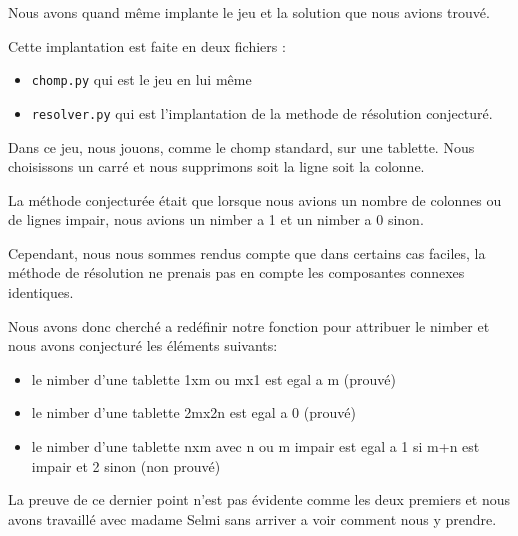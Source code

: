 Nous avons quand même implante le jeu et la solution que nous avions trouvé. 

Cette implantation est faite en deux fichiers :
\begin{itemize}
  \item \texttt{chomp.py} qui est le jeu en lui même
  \item \texttt{resolver.py} qui est l'implantation de la methode de résolution conjecturé.
\end{itemize}

Dans ce jeu, nous jouons, comme le chomp standard, sur une tablette. Nous choisissons un carré et nous supprimons soit la ligne soit la colonne. 

La méthode conjecturée était que lorsque nous avions un nombre de colonnes ou de lignes impair, nous avions un nimber a 1 et un nimber a 0 sinon.

Cependant, nous nous sommes rendus compte que dans certains cas faciles, la méthode de résolution ne prenais pas en compte les composantes connexes identiques.

Nous avons donc cherché a redéfinir notre fonction pour attribuer le nimber et nous avons conjecturé les éléments suivants:
\begin{itemize}
  \item le nimber d'une tablette 1xm ou mx1 est egal a m (prouvé)
  \item le nimber d'une tablette 2mx2n est egal a 0 (prouvé)
  \item le nimber d'une tablette nxm avec n ou m impair est egal a 1 si m+n est impair et 2 sinon (non prouvé)
\end{itemize}

La preuve de ce dernier point n'est pas évidente comme les deux premiers et nous avons travaillé avec madame Selmi sans arriver a voir comment nous y prendre.